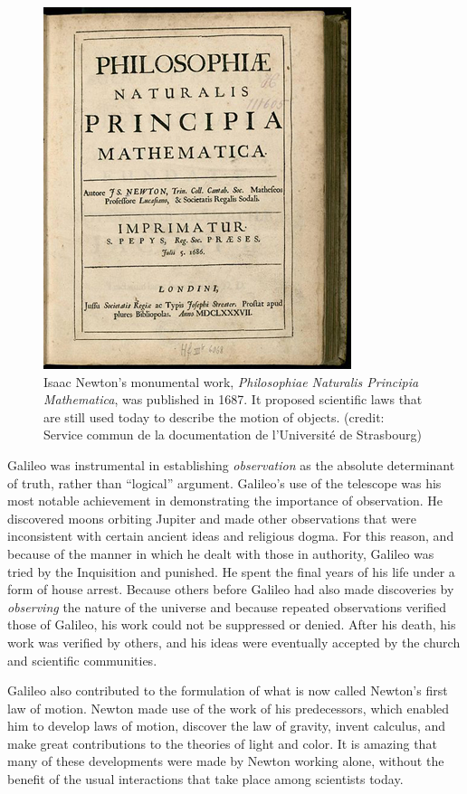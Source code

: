 \documentclass[
]{book}
\begin{document}
\begin{figure}
\hypertarget{import-auto-id2054696}{%
\centering
\includegraphics{images/Figure_04_00_02.jpg}
\caption{Isaac Newton's monumental work, \emph{Philosophiae Naturalis Principia
Mathematica}, was published in 1687. It proposed scientific laws that
are still used today to describe the motion of objects. (credit: Service
commun de la documentation de l'Université de
Strasbourg)}\label{import-auto-id2054696}
}
\end{figure}

Galileo was instrumental in establishing \emph{observation} as the absolute
determinant of truth, rather than ``logical'' argument. Galileo's use of
the telescope was his most notable achievement in demonstrating the
importance of observation. He discovered moons orbiting Jupiter and made
other observations that were inconsistent with certain ancient ideas and
religious dogma. For this reason, and because of the manner in which he
dealt with those in authority, Galileo was tried by the Inquisition and
punished. He spent the final years of his life under a form of house
arrest. Because others before Galileo had also made discoveries by
\emph{observing} the nature of the universe and because repeated observations
verified those of Galileo, his work could not be suppressed or denied.
After his death, his work was verified by others, and his ideas were
eventually accepted by the church and scientific communities.

Galileo also contributed to the formulation of what is now called
Newton's first law of motion. Newton made use of the work of his
predecessors, which enabled him to develop laws of motion, discover the
law of gravity, invent calculus, and make great contributions to the
theories of light and color. It is amazing that many of these
developments were made by Newton working alone, without the benefit of
the usual interactions that take place among scientists today.
\end{document}
